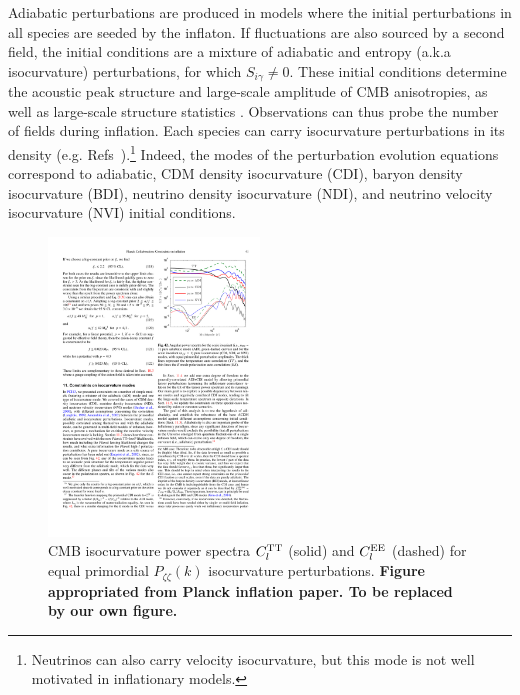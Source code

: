 Adiabatic perturbations are produced in models where the initial perturbations in all species are seeded by the inflaton. If fluctuations are also sourced by a second field, the initial conditions are a mixture of adiabatic and entropy (a.k.a isocurvature) perturbations, for which $S_{i\gamma}\neq 0$. These initial conditions determine the acoustic peak structure and large-scale amplitude of CMB anisotropies, as well as large-scale structure statistics \cite{Bond:1984fp,Kodama:1986fg,Kodama:1986ud,Hu:1994jd,Moodley:2004nz,Bean:2006qz}. Observations can thus probe the number of fields during inflation. 
\label{sec:isosec}
Each species can carry isocurvature perturbations in its density (e.g. Refs~\cite{Bucher:1999re,Bucher:2004an,Moodley:2004nz}).\footnote{Neutrinos can also carry velocity isocurvature, but this mode is not well motivated in inflationary models.} Indeed, the modes of the perturbation evolution equations correspond to adiabatic, CDM density isocurvature (CDI), baryon density isocurvature (BDI), neutrino density isocurvature (NDI), and neutrino velocity isocurvature (NVI) initial conditions. 

\begin{figure}[htbp!]
\includegraphics[width=0.5\textwidth, trim={0 10 0 0},clip]{./Inflation/iso_schematic.pdf} 
 \caption{CMB isocurvature power spectra $C_{l}^{\rm TT}$ (solid) and $C_{l}^{\rm EE}$ (dashed) for equal primordial $P_{\zeta\zeta}(k)$  isocurvature perturbations. \textbf{Figure appropriated from Planck inflation paper. To be replaced by our own figure.}
\label{fig:iso_schematic}}
\end{figure} 

